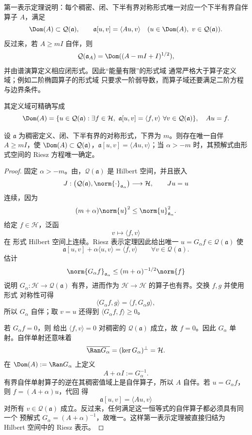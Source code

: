 \begin{theorem}[闭形式的表示定理]\label{thm:math-closed-form-representation}
第一表示定理说明：每个稠密、闭、下半有界对称形式唯一对应一个下半有界自伴算子 $A$，满足
\begin{equation*}\Dom(A)\subset\mathcal Q(\mathfrak a),
 \qquad
 \mathfrak a[u,v]=\langle Au,v\rangle
 \quad(u\in\Dom(A),\ v\in\mathcal Q(\mathfrak a)).
\end{equation*}
反过来，若 $A\ge mI$ 自伴，则
\[
 \mathcal Q(\mathfrak a_A)=\Dom((A-mI+I)^{1/2}),
\]
并由谱演算定义相应闭形式。因此“能量有限”的形式域 通常严格大于算子定义域；例如二阶椭圆算子的形式域 只要求一阶弱导数，而算子域还要满足二阶方程与边界条件。

其定义域可精确写成
\[
\Dom(A)=\{u\in\mathcal Q(\mathfrak a):\exists f\in\mathcal H,
\ \mathfrak a[u,v]=\langle f,v\rangle\ \forall v\in\mathcal Q(\mathfrak a)\},
\quad Au=f.
\]
\end{theorem}

\begin{theorem}[闭下半有界形式的第一表示定理]
设 $\mathfrak a$ 为稠密定义、闭、下半有界的对称形式，下界为 $m$。则存在唯一自伴 $A\ge mI$，使 $\Dom(A)\subset\mathcal Q(\mathfrak a)$，$\mathfrak a[u,v]=\langle Au,v\rangle$；当 $\alpha>-m$ 时，其预解式由形式空间的 Riesz 方程唯一确定。
\end{theorem}
\begin{proof}
固定 $\alpha>-m$。由，$\mathcal Q(\mathfrak a)$ 是 Hilbert 空间，并且嵌入
\[
 J:\bigl(\mathcal Q(\mathfrak a),\norm{\cdot}_{\mathfrak a_\alpha}\bigr)
 \longrightarrow\mathcal H,
 \qquad Ju=u
\]
连续，因为
\[
 (m+\alpha)\norm{u}^2
 \le\norm{u}_{\mathfrak a_\alpha}^2.
\]
给定 $f\in\mathcal H$，泛函
\[
 v\longmapsto\langle f,v\rangle
\]
在 形式 Hilbert 空间上连续。Riesz 表示定理因此给出唯一 $u=G_\alpha f\in\mathcal Q(\mathfrak a)$ 使
\begin{equation}\label{eq:math-sl-form-riesz-resolvent}
 \mathfrak a[u,v]+\alpha\langle u,v\rangle
 =\langle f,v\rangle
 \qquad\forall v\in\mathcal Q(\mathfrak a).
\end{equation}
估计
\[
 \norm{G_\alpha f}_{\mathfrak a_\alpha}
 \le (m+\alpha)^{-1/2}\norm{f}
\]
说明 $G_\alpha:\mathcal H\to\mathcal Q(\mathfrak a)$ 有界，进而作为 $\mathcal H\to\mathcal H$ 的算子也有界。交换 $f,g$ 并使用 形式 对称性可得
\[
 \langle G_\alpha f,g\rangle
 =\langle f,G_\alpha g\rangle,
\]
所以 $G_\alpha$ 自伴；取 $v=u$ 还得到 $\langle G_\alpha f,f\rangle\ge0$。

若 $G_\alpha f=0$，则 给出
$\langle f,v\rangle=0$ 对稠密的 $\mathcal Q(\mathfrak a)$ 成立，故 $f=0$。因此 $G_\alpha$ 单射。自伴单射还意味着
\[
 \overline{\Ran G_\alpha}=(\ker G_\alpha)^{\perp}=\mathcal H.
\]
在 $\Dom(A):=\Ran G_\alpha$ 上定义
\[
 A+\alpha I:=G_\alpha^{-1}.
\]
有界自伴单射算子的逆在其稠密值域上是自伴算子，所以 $A$ 自伴。若 $u=G_\alpha f$，则 $f=(A+\alpha)u$，代回 得
\[
 \mathfrak a[u,v]=\langle Au,v\rangle
\]
对所有 $v\in\mathcal Q(\mathfrak a)$ 成立。反过来，任何满足这一恒等式的自伴算子都必须具有同一个 预解式 $G_\alpha=(A+\alpha)^{-1}$，故唯一。这样第一表示定理被直接归结为 Hilbert 空间中的 Riesz 表示。
\end{proof}

